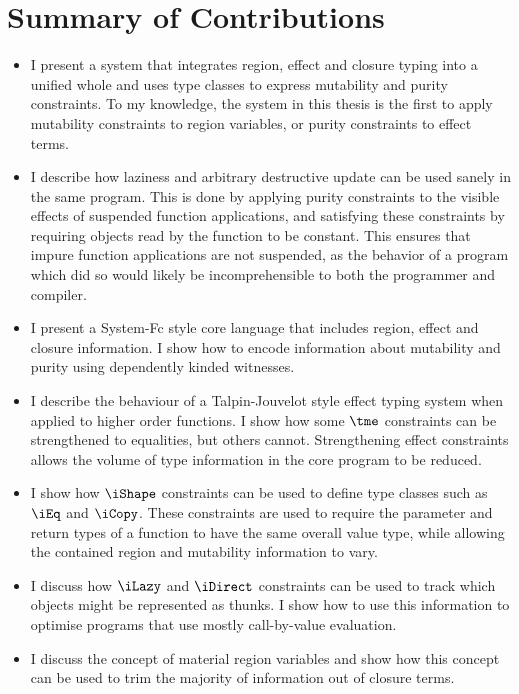 \section{Summary of Contributions}

\begin{itemize}
\item	I present a system that integrates region, effect and closure typing into a unified whole and uses type classes to express mutability and purity constraints. To my knowledge, the system in this thesis is the first to apply mutability constraints to region variables, or purity constraints to effect terms.

\item	I describe how laziness and arbitrary destructive update can be used sanely in the same program. This is done by applying purity constraints to the visible effects of suspended function applications, and satisfying these constraints by requiring objects read by the function to be constant. This ensures that impure function applications are not suspended, as the behavior of a program which did so would likely be incomprehensible to both the programmer and compiler.

\item	I present a System-Fc style core language that includes region, effect and closure information. I show how to encode information about mutability and purity using dependently kinded witnesses. 

\item	I describe the behaviour of a Talpin-Jouvelot style effect typing system when applied to higher order functions. I show how some $\tme$ constraints can be strengthened to equalities, but others cannot. Strengthening effect constraints allows the volume of type information in the core program to be reduced.

\item	I show how $\iShape$ constraints can be used to define type classes such as $\iEq$ and $\iCopy$. These constraints are used to require the parameter and return types of a function to have the same overall value type, while allowing the contained region and mutability information to vary.

\item	I discuss how $\iLazy$ and $\iDirect$ constraints can be used to track which objects might be represented as thunks. I show how to use this information to optimise programs that use mostly call-by-value evaluation.

\item	I discuss the concept of material region variables and show how this concept can be used to trim the majority of information out of closure terms. 


\end{itemize}
